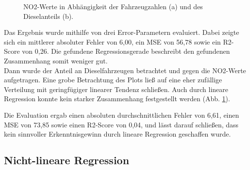 \documentclass[11pt,a4paper,oneside,german]{article}
\begin{document}
	\begin{figure}[h!]
		\centering
		\caption{NO2-Werte in Abhängigkeit der Fahrzeugzahlen (a) und des Dieselanteils (b).}
		\label{fig:linreginsgesamt}
	\end{figure}
	
	Das Ergebnis wurde mithilfe von drei Error-Parametern evaluiert. Dabei zeigte sich ein mittlerer absoluter Fehler von 6,00, ein MSE von 56,78 sowie ein R2-Score von 0,26. Die gefundene Regressionsgerade beschreibt den gefundenen Zusammenhang somit weniger gut. \\
	Dann wurde der Anteil an Dieselfahrzeugen betrachtet und gegen die NO2-Werte aufgetragen. Eine grobe Betrachtung des Plots ließ auf eine eher zufällige Verteilung mit geringfügiger linearer Tendenz schließen. Auch durch lineare Regression konnte kein starker Zusammenhang festgestellt werden (Abb. \ref{fig:linreginsgesamt}).

	
	Die Evaluation ergab einen absoluten durchschnittlichen Fehler von 6,61, einen MSE von 73,85 sowie einen R2-Score von 0,04, und lässt darauf schließen, dass kein sinnvoller Erkenntnisgewinn durch lineare Regression geschaffen wurde.
	
	\subsection{Nicht-lineare Regression}
	
\end{document}
